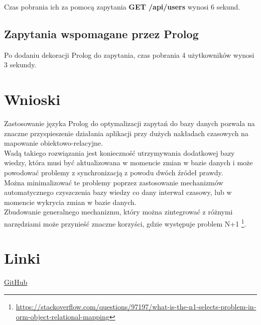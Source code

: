 \documentclass[12pt,a4paper]{article}
\begin{document}
Czas pobrania ich za pomocą zapytania \textbf{GET /api/users} wynosi 6 sekund.\\

\subsection{Zapytania wspomagane przez Prolog}

Po dodaniu dekoracji Prolog do zapytania, czas pobrania 4 użytkowników wynosi 3 sekundy.

\clearpage
\section{Wnioski}

Zastosowanie języka Prolog do optymalizacji zapytań do bazy danych pozwala na znaczne przyspieszenie działania aplikacji przy dużych nakładach czasowych na mapowanie obiektowo-relacyjne.\\

Wadą takiego rozwiązania jest konieczność utrzymywania dodatkowej bazy wiedzy, która musi być aktualizowana w momencie zmian w bazie danych i może powodować problemy z synchronizacją z powodu dwóch źródeł prawdy.\\

Można minimalizować te problemy poprzez zastosowanie mechanizmów automatycznego czyszczenia bazy wiedzy co dany interwał czasowy, lub w momencie wykrycia zmian w bazie danych.\\

Zbudowanie generalnego mechanizmu, który można zintegrować z różnymi narzędziami może przynieść znaczne korzyści, gdzie występuje problem N+1 \footnote{\href{https://stackoverflow.com/questions/97197/what-is-the-n1-selects-problem-in-orm-object-relational-mapping}{https://stackoverflow.com/questions/97197/what-is-the-n1-selects-problem-in-orm-object-relational-mapping}}.

\section{Linki}
\href{https://github.com/aazsamir/paradygmaty_projekt}{GitHub}
\end{document}
